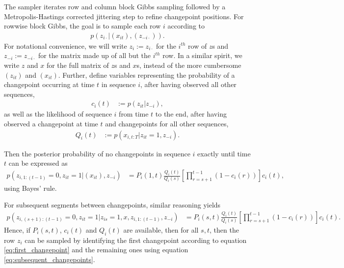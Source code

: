 \documentclass[14pt]{extarticle}
\begin{document}
The sampler iterates row and column block Gibbs sampling followed by a
Metropolis-Hastings corrected jittering step to refine changepoint positions.
For rowwise block Gibbs, the goal is to sample each row $i$ according to
\begin{align*}
  p\left(z_{i\cdot} \vert \left(x_{it}\right), \left(z_{-i \cdot}\right)\right).
\end{align*}
For notational convenience, we will write $z_{i} := z_{i\cdot}$ for the $i^{th}$
row of $z$s and $z_{-i} := z_{-i\cdot}$ for the matrix made up of all but the
$i^{th}$ row. In a similar spirit, we write $z$ and $x$ for the full matrix of
$z$s and $x$s, instead of the more cumbersome $\left(z_{it}\right)$ and
$\left(x_{it}\right)$. Further, define variables representing the probability of
a changepoint occurring at time $t$ in sequence $i$, after having observed all
other sequences,
\begin{align}
  \label{eq:basic_cit}
  c_{i}\left(t\right) &:= p\left(z_{it} \vert z_{-i}\right),
\end{align}
as well as the likelihood of sequence $i$ from time $t$ to the end, after having
observed a changepoint at time $t$ and changepoints for all other sequences,
\begin{align*}
  Q_{i}\left(t\right) &:= p\left(x_{i, t:T} \vert z_{it} = 1, z_{-i}\right).
\end{align*}

Then the posterior probability of no changepoints in sequence $i$ exactly until
time $t$ can be expressed as
\begin{align}
  p\left(z_{i, 1:\left(t - 1\right)} = 0, z_{it} = 1 \vert \left(x_{it}\right), z_{-i}\right) &= P_{i}\left(1, t\right)\frac{Q_{i}\left(t\right)}{Q_{i}\left(s\right)}\left[\prod_{r = s + 1}^{t - 1} \left(1 - c_{i}\left(r\right)\right)\right] c_{i}\left(t\right), \label{eq:first_changepoint}
\end{align}
using Bayes' rule.

For subsequent segments between changepoints, similar reasoning yields
\begin{align}
  p\left(z_{i, \left(s + 1\right):\left(t - 1\right)} = 0, z_{it} = 1 \vert z_{is} = 1, x, z_{i, 1:\left(t - 1\right)}, z_{-i}\right) &= P_{i}\left(s, t\right)\frac{Q_{i}\left(t\right)}{Q_{i}\left(s\right)} \left[\prod_{r = s + 1}^{t - 1} \left(1 - c_{i}\left(r\right)\right)\right]c_{i}\left(t\right). \label{eq:subsequent_changepoints}
\end{align}
Hence, if $P_{i}\left(s, t\right)$, $c_{i}\left(t\right)$ and
$Q_{i}\left(t\right)$ are available, then for all $s, t$, then the row $z_{i}$
can be sampled by identifying the first changepoint according to equation
\ref{eq:first_changepoint} and the remaining ones using equation
\ref{eq:subsequent_changepoints}.
\end{document}
